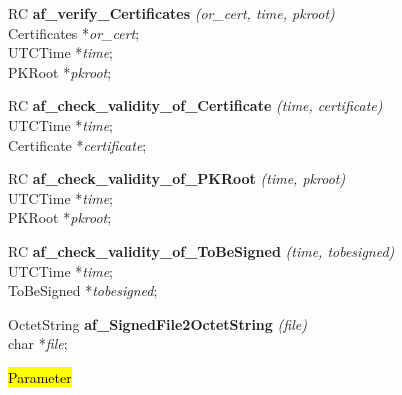RC {\bf af\_verify\_Certificates} {\em (or\_cert, time, pkroot)} \\
Certificates *{\em or\_cert}; \\
UTCTime *{\em time}; \\
PKRoot *{\em pkroot};

RC {\bf af\_check\_validity\_of\_Certificate} {\em (time, certificate)} \\
UTCTime *{\em time}; \\
Certificate *{\em certificate};

RC {\bf af\_check\_validity\_of\_PKRoot} {\em (time, pkroot)} \\
UTCTime *{\em time}; \\
PKRoot *{\em pkroot};

RC {\bf af\_check\_validity\_of\_ToBeSigned} {\em (time, tobesigned)} \\
UTCTime *{\em time}; \\
ToBeSigned *{\em tobesigned};

OctetString {\bf *af\_SignedFile2OctetString} {\em (file)} \\
char *{\em file};

\hl{Parameter}






